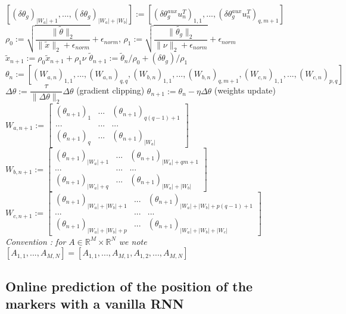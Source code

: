 \documentclass[twocolumn,a4paper]{svjour3} \sloppy          \smartqed
\begin{document}
\begin{figure*}[hbt!]
\begin{minipage}{.8\textwidth}
\begin{algorithm}[H]
\begin{algorithmic}[1]
\State $[(\delta\theta_g)_{|W_{a}|+1}, ..., (\delta\theta_g)_{|W_{a}|+|W_{b}|}] := [{(\delta\theta_g^{aux} u_n^T)}_{1,1}, ..., {(\delta\theta_g^{aux} u_n^T)}_{q,m+1}]$
\State 
\State $\rho_0 := \sqrt{\dfrac{\|\tilde{\theta}\|_2}{\|\tilde{x}\|_2+\epsilon_{norm}}}+\epsilon_{norm}$, 
\quad $\rho_1 := \sqrt{\dfrac{\|\tilde{\theta_g}\|_2}{\|\nu\|_2+\epsilon_{norm}}}+\epsilon_{norm}
$
\State $ \tilde{x}_{n+1} := \rho_0 \tilde{x}_{n+1} + \rho_1 \nu$ 
\quad $ \tilde{\theta}_{n+1}:= \tilde{\theta}_n/\rho_0 + (\delta\theta_g)/\rho_1$
\State $\theta_n := [(W_{a,n})_{1,1}, ..., (W_{a,n})_{q,q}, (W_{b,n})_{1,1}, ..., (W_{b,n})_{q,m+1}, (W_{c,n})_{1,1}, ..., (W_{c,n})_{p,q}]$
\State $\Delta\theta := \dfrac{\tau}{\|\Delta\theta\|_2} \Delta\theta $ (gradient clipping)
\EndIf 
\State $\theta_{n+1} := \theta_n - \eta \Delta\theta$ (weights update)
\State $ W_{a,n+1} := \begin{bmatrix} 
(\theta_{n+1})_1 &...& (\theta_{n+1})_{q(q-1)+1}\\
... &...& ...\\
(\theta_{n+1})_q &...& (\theta_{n+1})_{|W_a|}
\end{bmatrix} $ 
$ W_{b,n+1} := \begin{bmatrix} 
(\theta_{n+1})_{|W_a|+1} &...& (\theta_{n+1})_{|W_a|+qm+1}\\
... &...& ...\\
(\theta_{n+1})_{|W_a|+q} &...& (\theta_{n+1})_{|W_a|+|W_b|}
\end{bmatrix} $ 
\State $ W_{c,n+1} := \begin{bmatrix} 
(\theta_{n+1})_{|W_a|+|W_b|+1} & ... & (\theta_{n+1})_{|W_a|+|W_b|+p(q-1)+1}\\
... & ... & ...\\
(\theta_{n+1})_{|W_a|+|W_b|+p} & ... & (\theta_{n+1})_{|W_a|+|W_b|+|W_c|}
\end{bmatrix} $
\EndFor
\State
\State \textit{Convention : for} $A \in \mathbb{R}^{M} \times \mathbb{R}^{N}$ \textit{we note} $[A_{1,1}, ..., A_{M,N}] =
[A_{1,1}, ..., A_{M,1}, A_{1,2}, ..., A_{M,N}]$

\end{algorithmic}
\end{algorithm}

\end{minipage}

\end{figure*}


\subsection{Online prediction of the position of the markers with a vanilla RNN}
\end{document}
